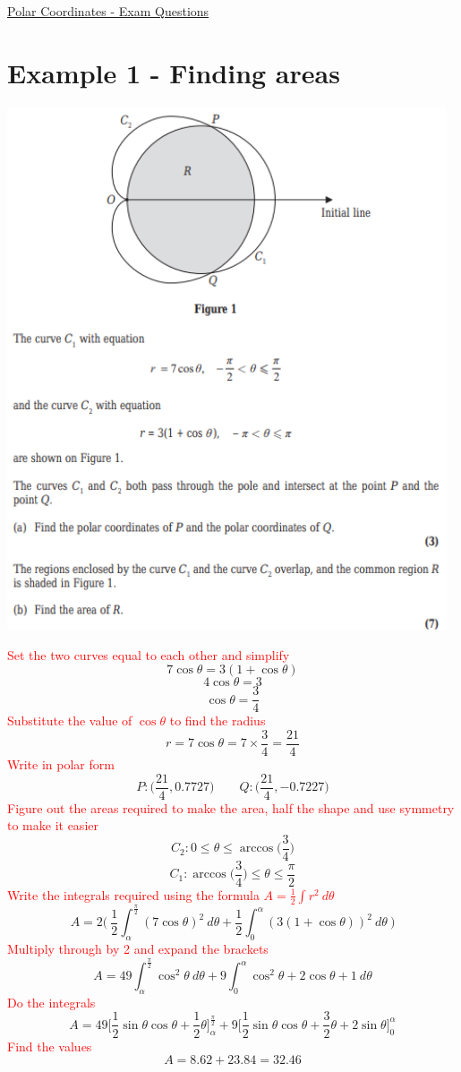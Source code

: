\documentclass{article}[18pt]
\begin{document}
\begin{center}
\underline{\huge Polar Coordinates - Exam Questions}
\end{center}
\section{Example 1 - Finding areas}
\begin{center}
\includegraphics[width=13cm]{Jun16Q8.png}
\end{center}

\textcolor{red}{Set the two curves equal to each other and simplify}
$$7\cos\theta=3(1+\cos\theta)$$
$$4\cos\theta=3$$
$$\cos\theta=\frac{3}{4}$$
\textcolor{red}{Substitute the value of $\cos\theta$ to find the radius}
$$r=7\cos\theta=7\times\frac{3}{4}=\frac{21}{4}$$
\textcolor{red}{Write in polar form}
$$P:\Bigg(\frac{21}{4},0.7727\Bigg) \qquad Q:\Bigg(\frac{21}{4},-0.7227\Bigg)$$
\textcolor{red}{Figure out the areas required to make the area, half the shape and use symmetry to make it easier}
$$C_2:0\leqslant\theta\leqslant\arccos\Bigg(\frac{3}{4}\Bigg)$$
$$C_1:\arccos\Big(\frac{3}{4}\Bigg)\leqslant\theta\leqslant\frac{\pi}{2}$$
\textcolor{red}{Write the integrals required using the formula $A=\frac{1}{2}\int r^2 \ d\theta$}
{\large
$$A=2\Big( \ \frac{1}{2}\int_\alpha^\frac{\pi}{2}(7\cos\theta)^2 \ d\theta+\frac{1}{2}\int_0^\alpha(3(1+\cos\theta))^2 \ d\theta \ \Big)$$}
\textcolor{red}{Multiply through by 2 and expand the brackets}
{\large
$$A=49\int_\alpha^\frac{\pi}{2}\cos^2\theta \ d\theta +9\int_0^\alpha \cos^2\theta+2\cos\theta+1 \ d\theta$$}
\textcolor{red}{Do the integrals}
{\large
$$A=49\Bigg[\frac{1}{2}\sin\theta\cos\theta+\frac{1}{2}\theta\Bigg]^\frac{\pi}{2}_\alpha+9\Bigg[\frac{1}{2}\sin\theta\cos\theta+\frac{3}{2}\theta+2\sin\theta\Bigg]^\alpha_0$$}
\textcolor{red}{Find the values}
$$A=8.62+23.84=32.46$$
\end{document}
